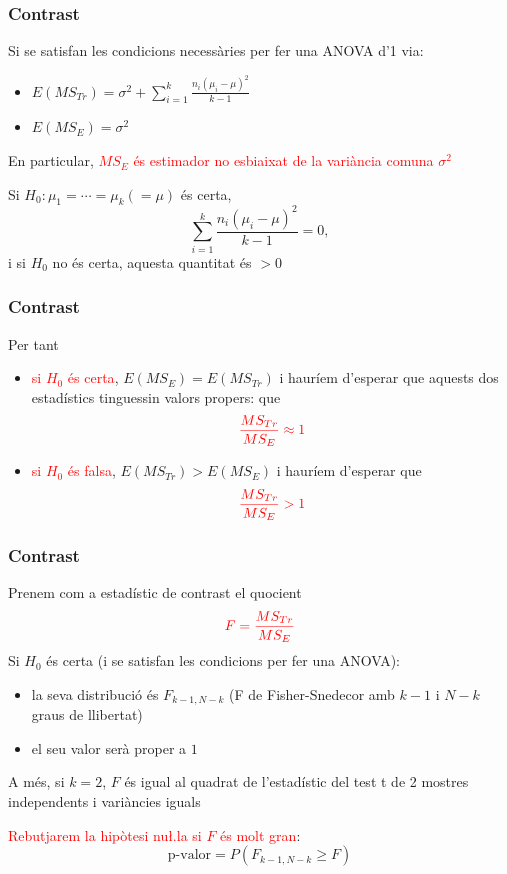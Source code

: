 \documentclass[12pt,t]{beamer}
\newcommand{\red}[1]{\textcolor{red}{#1}}
\renewcommand{\emph}[1]{{\color{red}#1}}
\renewcommand{\geq}{\geqslant}
\theoremstyle{plain}
\theoremstyle{definition}
\begin{document}
\begin{frame}
\frametitle{Contrast}

Si se satisfan les condicions necessàries per fer una ANOVA d'1 via:
\begin{itemize}
\item $E(MS_{Tr})=\displaystyle\sigma^2 + \sum_{i=1}^k \frac{n_i (\mu_i
-\mu)^2}{k-1}$
\medskip

\item $E(MS_E)=\sigma^2$
\end{itemize}
\bigskip

En particular, \red{$MS_E$ és estimador no esbiaixat de la variància comuna $\sigma^2$}
\pause\medskip


Si $H_0:\mu_1=\cdots=\mu_k (=\mu)$ és certa,
$$
\sum_{i=1}^k \frac{n_i (\mu_i -\mu)^2}{k-1}=0,
$$
i si $H_0$ no és certa, aquesta quantitat és $>0$

\end{frame}


\begin{frame}
\frametitle{Contrast}

Per tant
\medskip

\begin{itemize}
\item \red{si $H_0$ és certa}, $E(MS_E)=E(MS_{Tr})$ i hauríem d'esperar que aquests dos estadístics  tinguessin valors propers: que
$$
\red{\frac{MS_{Tr}}{MS_E}\approx 1}
$$
\item \red{si $H_0$ és falsa}, $E(MS_{Tr})>E(MS_E)$ i hauríem d'esperar que 
$$
\red{\frac{MS_{Tr}}{MS_E}> 1}
$$
\end{itemize}
\end{frame}


\begin{frame}
\frametitle{Contrast}

Prenem com a \emph{estadístic de contrast} el quocient 
$$
\red{F=\frac{MS_{Tr}}{MS_E}}
$$
Si $H_0$ és certa (i se satisfan les condicions per fer una ANOVA):
\begin{itemize}
\item la seva distribució és $F_{k-1,N-k}$ (F de Fisher-Snedecor 
amb $k-1$ i $N-k$ graus de llibertat)
\smallskip

\item el seu valor serà proper a $1$
\end{itemize}\medskip

A més, si $k=2$, $F$ és igual al quadrat de l'estadístic del test t de 2 mostres independents i variàncies iguals\pause\medskip

\red{Rebutjarem la hipòtesi nu\l.la si $F$ és molt gran}:
$$
\text{p-valor}=P(F_{k-1,N-k}\geq F)
$$



\end{frame}
\end{document}
